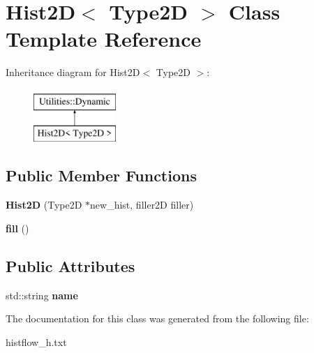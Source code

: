 \hypertarget{classHist2D}{}\section{Hist2D$<$ Type2D $>$ Class Template Reference}
\label{classHist2D}
Inheritance diagram for Hist2D$<$ Type2D $>$\+:\begin{figure}[H]
\begin{center}
\leavevmode
\includegraphics[height=2.000000cm]{classHist2D}
\end{center}
\end{figure}
\subsection*{Public Member Functions}
\begin{DoxyCompactItemize}
\item 
{\bfseries Hist2D} (Type2D $\ast$new\+\_\+hist, filler2D filler)\hypertarget{classHist2D_ac6f6dd5407b013b675d00ad9689257ef}{}\label{classHist2D_ac6f6dd5407b013b675d00ad9689257ef}

\item 
{\bfseries fill} ()\hypertarget{classHist2D_a52b6422b779adf4cdf9aab4119e2248a}{}\label{classHist2D_a52b6422b779adf4cdf9aab4119e2248a}

\end{DoxyCompactItemize}
\subsection*{Public Attributes}
\begin{DoxyCompactItemize}
\item 
std\+::string {\bfseries name}\hypertarget{classHist2D_a4bab52e7321431214528519b389bf5d2}{}\label{classHist2D_a4bab52e7321431214528519b389bf5d2}

\end{DoxyCompactItemize}


The documentation for this class was generated from the following file\+:\begin{DoxyCompactItemize}
\item 
histflow\+\_\+h.\+txt\end{DoxyCompactItemize}
